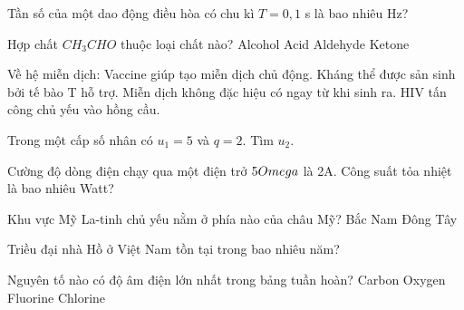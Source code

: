 \begin{ex}
    Tần số của một dao động điều hòa có chu kì $T = 0,1$ s là bao nhiêu Hz?
\end{ex}

\begin{ex}
    Hợp chất $CH_3CHO$ thuộc loại chất nào?
    \choice
    {Alcohol}
    {Acid}
    {\True Aldehyde}
    {Ketone}
\end{ex}

\begin{ex}
    Về hệ miễn dịch:
    \choiceTF
    {\True Vaccine giúp tạo miễn dịch chủ động.}
    {Kháng thể được sản sinh bởi tế bào T hỗ trợ.}
    {\True Miễn dịch không đặc hiệu có ngay từ khi sinh ra.}
    {HIV tấn công chủ yếu vào hồng cầu.}
\end{ex}

\begin{ex}
    Trong một cấp số nhân có $u_1 = 5$ và $q = 2$. Tìm $u_2$.
\end{ex}

\begin{ex}
    Cường độ dòng điện chạy qua một điện trở $5 \\Omega$ là 2A. Công suất tỏa nhiệt là bao nhiêu Watt?
\end{ex}

\begin{ex}
    Khu vực Mỹ La-tinh chủ yếu nằm ở phía nào của châu Mỹ?
    \choice
    {Bắc}
    {\True Nam}
    {Đông}
    {Tây}
\end{ex}

\begin{ex}
    Triều đại nhà Hồ ở Việt Nam tồn tại trong bao nhiêu năm?
\end{ex}

\begin{ex}
    Nguyên tố nào có độ âm điện lớn nhất trong bảng tuần hoàn?
    \choice
    {Carbon}
    {Oxygen}
    {\True Fluorine}
    {Chlorine}
\end{ex}

